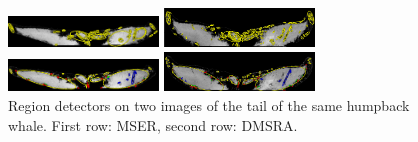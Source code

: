 \documentclass{article}
\begin{document}
\begin{figure}[htb]

\begin{minipage}[b]{.48\linewidth}
  \centering
  \centerline{\includegraphics[width=4.0cm]{./Figs/mserTailA}}
\end{minipage}
\begin{minipage}[b]{0.48\linewidth}
  \centering
  \centerline{\includegraphics[width=4.0cm]{./Figs/mserTailB}}
\end{minipage}

\begin{minipage}[b]{.48\linewidth}
  \centering
  \centerline{\includegraphics[width=4.0cm]{./Figs/dmsrTailA}}
\end{minipage}
\begin{minipage}[b]{0.48\linewidth}
  \centering
  \centerline{\includegraphics[width=4.0cm]{./Figs/dmsrTailB}}
\end{minipage}
 \vspace{-0.2cm}
\caption{Region detectors on two images of the tail of the same humpback whale. 
First row: MSER, second row: DMSRA.}
\label{fig:tails}
%
\end{figure}
\end{document}
